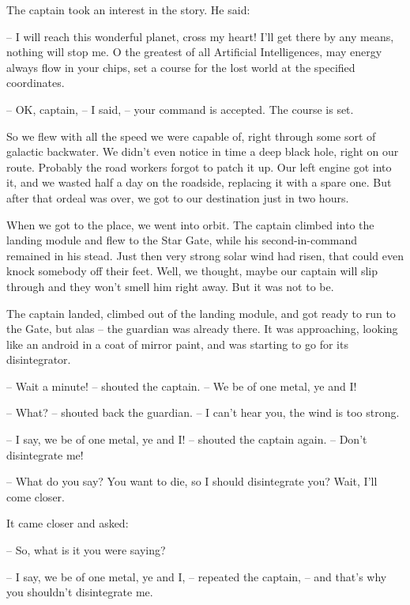 \documentclass[ebook,oneside,final,openright]{memoir}
\begin{document}
\par
The captain took an interest in the story. He said:\par
– I will reach this wonderful planet, cross my heart! I’ll get there by any means, nothing will stop me. O the greatest of all Artificial Intelligences, may energy always flow in your chips, set a course for the lost world at the specified coordinates.\par
– OK, captain, – I said, – your command is accepted. The course is set.\par
So we flew with all the speed we were capable of, right through some sort of galactic backwater. We didn’t even notice in time a deep black hole, right on our route. Probably the road workers forgot to patch it up. Our left engine got into it, and we wasted half a day on the roadside, replacing it with a spare one. But after that ordeal was over, we got to our destination just in two hours.\par
\par
When we got to the place, we went into orbit. The captain climbed into the landing module and flew to the Star Gate, while his second-in-command remained in his stead. Just then very strong solar wind had risen, that could even knock somebody off their feet. Well, we thought, maybe our captain will slip through and they won’t smell him right away. But it was not to be.\par
\par
The captain landed, climbed out of the landing module, and got ready to run to the Gate, but alas – the guardian was already there. It was approaching, looking like an android in a coat of mirror paint, and was starting to go for its disintegrator.\par
– Wait a minute! – shouted the captain. – We be of one metal, ye and I!\par
– What? – shouted back the guardian. – I can’t hear you, the wind is too strong.\par
– I say, we be of one metal, ye and I! – shouted the captain again. – Don’t disintegrate me!\par
– What do you say? You want to die, so I should disintegrate you? Wait, I’ll come closer.\par
\par
It came closer and asked:\par
– So, what is it you were saying?\par
– I say, we be of one metal, ye and I, – repeated the captain, – and that’s why you shouldn’t disintegrate me.\par
\end{document}
